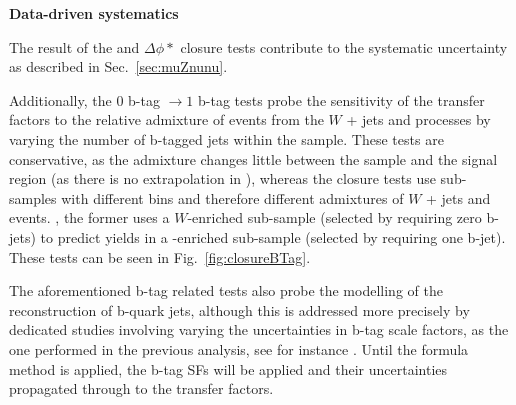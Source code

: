 {\bf Data-driven systematics}

The result of the \alphat and $\Delta\phi *$ closure tests contribute
to the systematic uncertainty as described in Sec.~\ref{sec:muZnunu}.

Additionally, the $0$ b-tag $\rightarrow1$ b-tag
tests probe the sensitivity of the transfer factors to the relative
admixture of events from the $W$ + jets and \ttbar processes by
varying the number of b-tagged jets within the \mj sample. These tests
are conservative, as the admixture changes little between the \mj
sample and the signal region (as there is no extrapolation in \nb),
whereas the closure tests use sub-samples with different \nb bins and
therefore different admixtures of $W$ + jets and \ttbar events. \eg,
the former uses a $W$-enriched sub-sample (selected by requiring zero
b-jets) to predict yields in a \ttbar-enriched sub-sample (selected by
requiring one b-jet). These tests can be seen in
Fig.~\ref{fig:closureBTag}.

The aforementioned b-tag related tests also probe the modelling of
the reconstruction of b-quark jets, although this is addressed more
precisely by dedicated studies involving varying the uncertainties in
b-tag scale factors, as the one performed in the previous analysis,
see for instance \cite{CMS_AN_2013-366}. Until the formula method is
applied, the b-tag SFs will be applied and their uncertainties
propagated through to the transfer factors.

